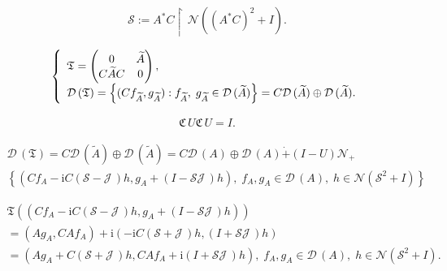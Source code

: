 \documentclass[10pt,a4paper]{amsart}
\def\uphar{{\upharpoonright\,}}
\newcommand{\cD}{\mathcal{D}\,}
\newcommand{\cJ}{\mathcal{J}\,}
\newcommand{\cN}{\mathcal{N}}
\newcommand{\cS}{\mathcal{S}}
\newcommand{\gC}{\mathfrak{C}}
\newcommand{\gT}{\mathfrak{T}}
\newcommand{\ii}{\mathrm{i}}
\begin{document}
\begin{align}\label{defics}
\cS:=A^*C\uphar\cN((A^*C)^2+I).
\end{align}

\begin{equation}
\label{matrixtbt3}
\left\{\begin{array}{l}\gT=
\begin{pmatrix}
 0 & \widetilde A\cr C\widetilde A C & 0
\end{pmatrix},\\[2mm]
\cD(\gT)=\left\{(Cf_{\widetilde A},g_{\widetilde A}): f_{\widetilde A},\; g_{\widetilde A}\in\cD(\widetilde A)\right\}=C\cD(\widetilde A)\oplus\cD(\widetilde A).
\end{array}\right.
\end{equation}

\begin{align}\label{conditionCU}\gC\,U \gC\, U=I.
\end{align}

\begin{equation}\label{rev02a}
\begin{array}{l}
\cD(\gT)=C\cD(\widetilde A)\oplus\cD(\widetilde A)%
=C\cD(A)\oplus\cD(A)\dot+(I-U)\cN_+\\[2mm]
\left\{(Cf_A-\ii C(\cS-\cJ)h,g_A+(I-\cS \cJ) h),\; %
f_A,g_A\in\cD(A),\;h\in\cN(\cS^2+I)\right\}
\end{array}
\end{equation}

\begin{equation}\label{ver02ba}
\begin{array}{l}
\gT\left((Cf_A-\ii C(\cS-\cJ)h,g_A+(I-\cS \cJ) h)\right)\\
=\left(Ag_A,CAf_A\right)
+\ii\left(-\ii C(\cS+\cJ)h,(I+\cS \cJ) h\right)\\[2mm]
=\left(Ag_A+C(\cS+\cJ)h, CAf_A+\ii(I+\cS \cJ) h\right),\;%
 f_A,g_A\in\cD(A),\;h\in\cN(\cS^2+I).
\end{array}
\end{equation}
\end{document}
